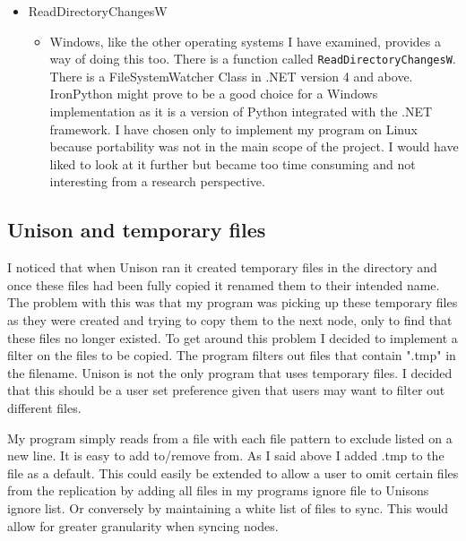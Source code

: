 \documentclass[12pt]{article}
\begin{document}
\begin{itemize}
    \item ReadDirectoryChangesW
        \begin{itemize}
        \item Windows, like the other operating systems
        I have examined, provides a way of doing this
        too. There is a function called \texttt{ReadDirectoryChangesW}.
        There is a FileSystemWatcher Class in .NET version 4 and
        above. IronPython might prove to be a good choice for a
        Windows implementation as it is a version of Python integrated
        with the .NET framework. I have chosen only to implement
        my program on Linux because portability was not in the main
        scope of the project. I would have liked to look
        at it further but became too time consuming and not interesting
        from a research perspective.
        \end{itemize}
\end{itemize}

\subsection{Unison and temporary files}
I noticed that when Unison ran it created temporary files in the
directory and once these files had been fully copied it renamed
them to their intended name. The problem with this was that my program
was picking up these temporary files as they were created and trying to
copy them to the next node, only to find that these files no longer existed.
To get around this problem I decided to implement a filter on the files to
be copied. The program filters out files that contain ".tmp" in the filename.
Unison is not the only program that uses temporary files. I decided that this
should be a user set preference given that users may want to filter out different
files.

My program simply reads from a file with each file pattern to exclude
listed on a new line. It is easy to add to/remove from. As I said above
I added .tmp to the file as a default. This could easily be extended
to allow a user to omit certain files from the replication by adding
all files in my programs ignore file to Unisons ignore list. Or conversely
by maintaining a white list of files to sync. This would allow for
greater granularity when syncing nodes.
\end{document}
